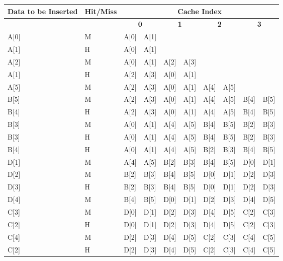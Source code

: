 \documentclass[addpoints]{exam}
\begin{document}
\begin{sloppypar}
\begin{questions}
\begin{parts}
        \begin{tabular}{|m{15mm} | m{17mm} | m{7.60mm} |m{7.60mm} |m{7.60mm} |m{7.60mm} |m{7.60mm} |m{7.60mm} |m{7.60mm} |m{7.60mm} |}
            \hline
            \raggedright\textbf{Data to \hspace*{3.5mm} be Inserted} &\raggedright \textbf{Hit/Miss} & \multicolumn{8}{|c|}{\textbf{Cache Index}} \\ \hline 
            & & \multicolumn{2}{|c|}{\textbf{0}} & \multicolumn{2}{|c|}{\textbf{1}} & \multicolumn{2}{|c|}{\textbf{2}} & \multicolumn{2}{|c|}{\textbf{3}} \\ \hline
            A[0] & M & A[0] & A[1] & & & & & & \\ \hline
            A[1] & H & A[0] & \textcolor{my_green}{A[1]} & & & & & & \\ \hline
            A[2] & M & A[0] & A[1] & A[2] & A[3] & & & &\\ \hline
            A[1] & H & A[2] & A[3] & A[0] & \textcolor{my_green}{A[1]} & & & & \\ \hline
            A[5] & M & A[2] & A[3] & A[0] & A[1] & A[4] & A[5] & & \\ \hline
            B[5] & M & A[2] & A[3] & A[0] & A[1] & A[4] & A[5] & B[4] & B[5] \\ \hline
            B[4] & H & A[2] & A[3] & A[0] & A[1] & A[4] & A[5] & \textcolor{my_green}{B[4]} & B[5] \\ \hline
            B[3] & M & A[0] & A[1] & A[4] & A[5] & B[4] & B[5] & B[2] & B[3] \\ \hline
            B[3] & H & A[0] & A[1] & A[4] & A[5] & B[4] & B[5] & B[2] & \textcolor{my_green}{B[3]} \\ \hline
            B[4] & H & A[0] & A[1] & A[4] & A[5] & B[2] & B[3] & \textcolor{my_green}{B[4]} & B[5] \\ \hline
            D[1] & M & A[4] & A[5] & B[2] & B[3] & B[4] & B[5] & D[0] & D[1] \\ \hline
            D[2] & M & B[2] & B[3] & B[4] & B[5] & D[0] & D[1] & D[2] & D[3] \\ \hline
            D[3] & H & B[2] & B[3] & B[4] & B[5] & D[0] & D[1] & D[2] & \textcolor{my_green}{D[3]} \\ \hline
            D[4] & M & B[4] & B[5] & D[0] & D[1] & D[2] & D[3] & D[4] & D[5] \\ \hline
            C[3] & M & D[0] & D[1] & D[2] & D[3] & D[4] & D[5] & C[2] & C[3] \\ \hline
            C[2] & H & D[0] & D[1] & D[2] & D[3] & D[4] & D[5] & \textcolor{my_green}{C[2]} & C[3] \\ \hline
            C[4] & M & D[2] & D[3] & D[4] & D[5] & C[2] & C[3] & C[4] & C[5] \\ \hline
            C[2] & H & D[2] & D[3] & D[4] & D[5] & \textcolor{my_green}{C[2]} & C[3] & C[4] & C[5] \\ \hline
        \end{tabular}


\end{parts}
\end{questions}
\end{sloppypar}
\end{document}
